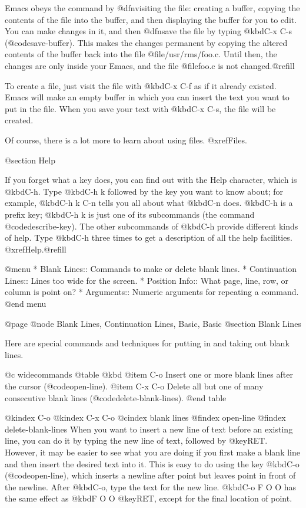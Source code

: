{{{  Emacs obeys the command by @dfn{visiting} the file: creating a buffer,
copying the contents of the file into the buffer, and then displaying the
buffer for you to edit.  You can make changes in it, and then @dfn{save}
the file by typing @kbd{C-x C-s} (@code{save-buffer}).  This makes the
changes permanent by copying the altered contents of the buffer back into
the file @file{/usr/rms/foo.c}.  Until then, the changes are only inside
your Emacs, and the file @file{foo.c} is not changed.@refill

  To create a file, just visit the file with @kbd{C-x C-f} as if it already
existed.  Emacs will make an empty buffer in which you can insert the text
you want to put in the file.  When you save your text with @kbd{C-x C-s},
the file will be created.

  Of course, there is a lot more to learn about using files.  @xref{Files}.

@section Help

  If you forget what a key does, you can find out with the Help character,
which is @kbd{C-h}.  Type @kbd{C-h k} followed by the key you want to know
about; for example, @kbd{C-h k C-n} tells you all about what @kbd{C-n}
does.  @kbd{C-h} is a prefix key; @kbd{C-h k} is just one of its
subcommands (the command @code{describe-key}).  The other subcommands of
@kbd{C-h} provide different kinds of help.  Type @kbd{C-h} three times
to get a description of all the help facilities.  @xref{Help}.@refill

@menu
* Blank Lines::        Commands to make or delete blank lines.
* Continuation Lines:: Lines too wide for the screen.
* Position Info::      What page, line, row, or column is point on?
* Arguments::	       Numeric arguments for repeating a command.
@end menu

@page
@node Blank Lines, Continuation Lines, Basic, Basic
@section Blank Lines

  Here are special commands and techniques for putting in and taking out
blank lines.

@c widecommands
@table @kbd
@item C-o
Insert one or more blank lines after the cursor (@code{open-line}).
@item C-x C-o
Delete all but one of many consecutive blank lines
(@code{delete-blank-lines}).
@end table

@kindex C-o
@kindex C-x C-o
@cindex blank lines
@findex open-line
@findex delete-blank-lines
  When you want to insert a new line of text before an existing line, you
can do it by typing the new line of text, followed by @key{RET}.  However,
it may be easier to see what you are doing if you first make a blank line
and then insert the desired text into it.  This is easy to do using the key
@kbd{C-o} (@code{open-line}), which inserts a newline after point but leaves
point in front of the newline.  After @kbd{C-o}, type the text for the new
line.  @kbd{C-o F O O} has the same effect as @kbd{F O O @key{RET}}, except for
the final location of point.

}}}
